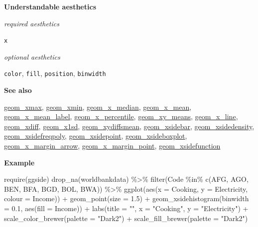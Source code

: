 \documentclass[
  letterpaper,
  DIV=11,
  numbers=noendperiod]{scrreprt}
\newenvironment{Shaded}{\begin{snugshade}}{\end{snugshade}}
\newcommand{\AttributeTok}[1]{\textcolor[rgb]{0.40,0.45,0.13}{#1}}
\newcommand{\FloatTok}[1]{\textcolor[rgb]{0.68,0.00,0.00}{#1}}
\newcommand{\FunctionTok}[1]{\textcolor[rgb]{0.28,0.35,0.67}{#1}}
\newcommand{\NormalTok}[1]{\textcolor[rgb]{0.00,0.23,0.31}{#1}}
\newcommand{\SpecialCharTok}[1]{\textcolor[rgb]{0.37,0.37,0.37}{#1}}
\newcommand{\StringTok}[1]{\textcolor[rgb]{0.13,0.47,0.30}{#1}}
\begin{document}
\textbf{Understandable aesthetics}

\emph{required aesthetics}

\texttt{x}

\emph{optional aesthetics}

\texttt{color}, \texttt{fill}, \texttt{position}, \texttt{binwidth}

\textbf{See also}

\href{@xmax}{geom\_xmax}, \href{@xmin}{geom\_xmin},
\href{@x_median}{geom\_x\_median}, \href{@x_mean}{geom\_x\_mean},
\href{@x_mean_label}{geom\_x\_mean\_label},
\href{@x_percentile}{geom\_x\_percentile},
\href{@xy_means}{geom\_xy\_means}, \href{@x_line}{geom\_x\_line},
\href{@xdiff}{geom\_xdiff}, \href{@x1sd}{geom\_x1sd},
\href{@xydiffsmean}{geom\_xydiffsmean},
\href{@xsidebar}{geom\_xsidebar},
\href{@xsidedensity}{geom\_xsidedensity},
\href{@xsidefreqpoly}{geom\_xsidefreqpoly},
\href{@xsidepoint}{geom\_xsidepoint},
\href{@xsideboxplot}{geom\_xsideboxplot},
\href{@x_margin_arrow}{geom\_x\_margin\_arrow},
\href{@x_margin_point}{geom\_x\_margin\_point},
\href{@xsidefunction}{geom\_xsidefunction}

\textbf{Example}

\begin{Shaded}
\begin{Highlighting}[]
\FunctionTok{require}\NormalTok{(ggside)}
\FunctionTok{drop\_na}\NormalTok{(worldbankdata) }\SpecialCharTok{\%\textgreater{}\%} 
  \FunctionTok{filter}\NormalTok{(Code }\SpecialCharTok{\%in\%} \FunctionTok{c}\NormalTok{(}\StringTok{\textquotesingle{}AFG\textquotesingle{}}\NormalTok{, }\StringTok{\textquotesingle{}AGO\textquotesingle{}}\NormalTok{, }\StringTok{\textquotesingle{}BEN\textquotesingle{}}\NormalTok{, }\StringTok{\textquotesingle{}BFA\textquotesingle{}}\NormalTok{, }\StringTok{\textquotesingle{}BGD\textquotesingle{}}\NormalTok{, }\StringTok{\textquotesingle{}BOL\textquotesingle{}}\NormalTok{, }\StringTok{\textquotesingle{}BWA\textquotesingle{}}\NormalTok{)) }\SpecialCharTok{\%\textgreater{}\%} 
  \FunctionTok{ggplot}\NormalTok{(}\FunctionTok{aes}\NormalTok{(}\AttributeTok{x =}\NormalTok{ Cooking, }\AttributeTok{y =}\NormalTok{ Electricity, }\AttributeTok{colour =}\NormalTok{ Income)) }\SpecialCharTok{+}
  \FunctionTok{geom\_point}\NormalTok{(}\AttributeTok{size =} \FloatTok{1.5}\NormalTok{) }\SpecialCharTok{+} 
  \FunctionTok{geom\_xsidehistogram}\NormalTok{(}\AttributeTok{binwidth =} \FloatTok{0.1}\NormalTok{, }\FunctionTok{aes}\NormalTok{(}\AttributeTok{fill =}\NormalTok{ Income)) }\SpecialCharTok{+}
  \FunctionTok{labs}\NormalTok{(}\AttributeTok{title =} \StringTok{""}\NormalTok{, }\AttributeTok{x =} \StringTok{"Cooking"}\NormalTok{, }\AttributeTok{y =} \StringTok{"Electricity"}\NormalTok{) }\SpecialCharTok{+} \FunctionTok{scale\_color\_brewer}\NormalTok{(}\AttributeTok{palette =} \StringTok{"Dark2"}\NormalTok{) }\SpecialCharTok{+} \FunctionTok{scale\_fill\_brewer}\NormalTok{(}\AttributeTok{palette =} \StringTok{"Dark2"}\NormalTok{)}
\end{Highlighting}
\end{Shaded}
\end{document}

